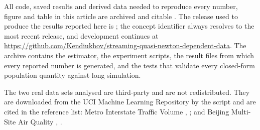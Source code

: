 All code, saved results and derived data needed to reproduce every number, figure and table in this
article are archived and citable \citep{kendiukhov2026bgsn}. The release used to produce the results
reported here is ; the concept identifier
 always resolves to the most recent release, and development continues
at \url{https://github.com/Kendiukhov/streaming-quasi-newton-dependent-data}. The archive contains the
estimator, the experiment scripts, the result files from which every reported number is generated,
and the tests that validate every closed-form population quantity against long simulation.

The two real data sets analysed are third-party and are not redistributed. They are downloaded from
the UCI Machine Learning Repository by the script  and are cited in the
reference list: Metro Interstate Traffic Volume \citep{hogue2019metro}, ; and
Beijing Multi-Site Air Quality \citep{chen2019beijingairuci}, .
